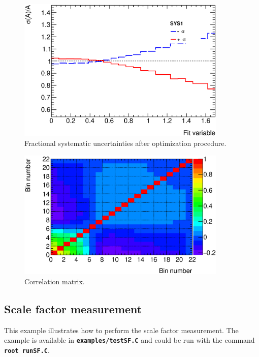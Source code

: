 \documentclass[12pt]{article}
\newcommand\verbbfb[1]{\textcolor[rgb]{0,0,0}{\texttt{\textbf{#1}}}}
\begin{document}
\begin{figure}[hbtp]
\begin{center}
\includegraphics[width=10cm]{pics/sys.eps}
\caption{Fractional systematic uncertainties after optimization
procedure.}
\label{fig:sys}
\end{center}
\end{figure}

\begin{figure}[hbtp]
\begin{center}
\includegraphics[width=10cm]{pics/matrix.eps}
\caption{Correlation matrix.}
\label{fig:matrix}
\end{center}
\end{figure}

\FloatBarrier

\subsection{Scale factor measurement}
\label{sec:exampleSF}

This example illustrates how to perform the scale factor measurement. The example is available in
\verbbfb{examples/testSF.C} and could be run with the command
\verbbfb{root runSF.C}.
\end{document}
